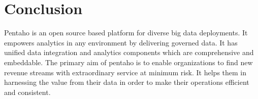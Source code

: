 \documentclass[9pt,twocolumn,twoside]{styles/osajnl}
\begin{document}
\section{Conclusion}

Pentaho is an open source based platform for diverse big data
deployments. It empowers analytics in any environment by delivering
governed data. It has unified data integration and analytics
components which are comprehensive and embeddable. The primary aim of
pentaho is to enable organizations to find new revenue streams with
extraordinary service at minimum risk. It helps them in harnessing the
value from their data in order to make their operations efficient and
consistent.




 

\newpage

\appendix
\end{document}
